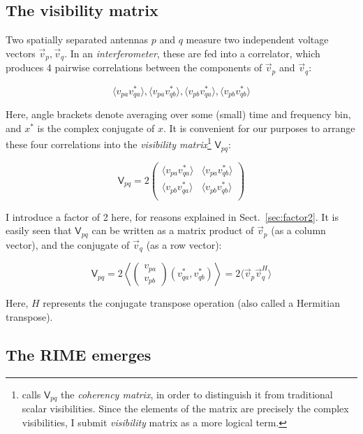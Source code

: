 \documentclass[referee]{aa}
\newcommand{\matrixtt}[4]{\left( \begin{array}{cc}#1&#2\\#3&#4\\\end{array} \right)}
\newcommand{\herm}{H}
\newcommand{\coh}[2]{\mathsf{{#1}}_{{#2}}}
\begin{document}
\subsection{The visibility matrix}

Two spatially separated antennas $p$ and $q$ measure two independent voltage vectors $\vec v_p,\vec v_q$. In an {\em interferometer}, these are fed into a correlator, which produces 4 pairwise correlations between the components of $\vec v_p$ and $\vec v_q$:

    \begin{equation}\label{eq:correlation}
    \langle v_{pa}v^*_{qa}\rangle, \langle v_{pa}v^*_{qb}\rangle, 
    \langle v_{pb}v^*_{qa}\rangle, \langle v_{pb}v^*_{qb}\rangle
    \end{equation}

Here, angle brackets denote averaging over some (small) time and frequency bin, and $x^*$ is the complex conjugate of $x$.  It is convenient for our purposes to arrange these four correlations into the {\em visibility matrix\/}\footnote{\citet{ME4} calls $\coh{V}{pq}$ the {\em coherency matrix}, in order to distinguish it from traditional scalar visibilities. Since the elements of the matrix are precisely the complex visibilities, I submit {\em visibility} matrix as a more logical term.} $\coh{V}{pq}$:

    \[
    \coh{V}{pq} = 2 \matrixtt{\langle v_{pa}v^*_{qa}\rangle}{\langle v_{pa}v^*_{qb}\rangle}{\langle v_{pb}v^*_{qa}\rangle}{\langle v_{pb}v^*_{qb}\rangle}
    \]

I introduce a factor of 2 here, for reasons explained in Sect.~\ref{sec:factor2}. It is easily seen that $\coh{V}{pq}$ can be written as a matrix product of $\vec v_p$ (as a column vector), and the conjugate of $\vec v_q$ (as a row vector):

\begin{equation}\label{eq:coherency}
\coh{V}{pq} = 2 \left<\left( \begin{array}{c}v_{pa}\\v_{pb}\end{array} \right) (v^*_{qa},v^*_{qb}) \right > = 2 \langle \vec v_p \vec v^\herm_q \rangle
\end{equation}

Here, $\herm$ represents the conjugate transpose operation (also called a Hermitian transpose).

\subsection{\label{sec:RIME-emerges}The RIME emerges}
\end{document}
